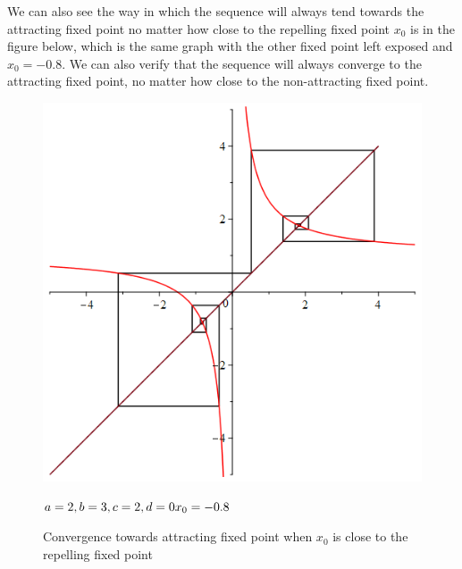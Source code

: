 \documentclass[12pt]{article}
\begin{document}
We can also see the way in which the sequence will always tend towards the attracting fixed point no matter how close to the repelling fixed point $x_0$ is in the figure below, which is the same graph with the other fixed point left exposed and $x_0=-0.8$.
We can also verify that the sequence will always converge to the attracting fixed point, no matter how close to the non-attracting fixed point.
	\begin{figure}[H]
		\begin{minipage}{0.725\textwidth}
			\hfill
			\includegraphics[scale=0.4]{fixedPointsCobwebMinOne.png}
		\end{minipage}
	\hfill
		\begin{minipage}{0.2\textwidth}
			$a=2,\\b=3,\\ c=2,\\ d=0\\x_0=-0.8$
		\end{minipage}
	\caption{Convergence towards attracting fixed point when $x_0$ is close to the repelling fixed point}
	\label{fig:mobAs}
	\end{figure}
\end{document}

